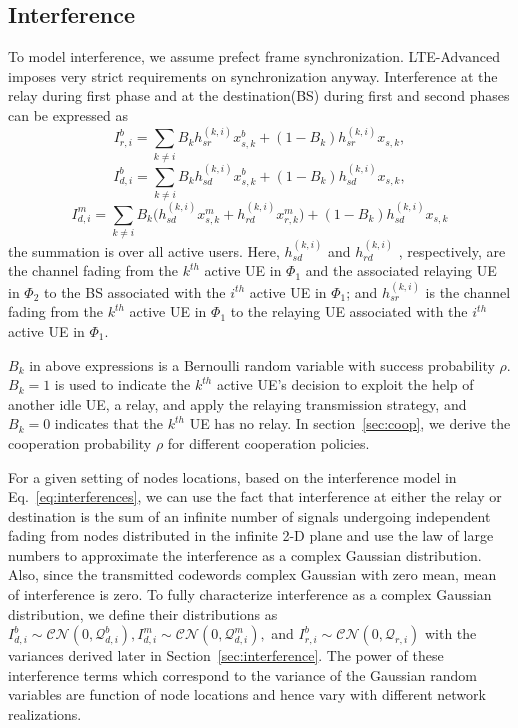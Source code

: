 \documentclass[titlepage]{article}
\begin{document}
\subsection{Interference}
To model interference, we assume prefect frame synchronization. LTE-Advanced imposes very strict requirements on synchronization anyway. Interference at the relay during first phase and at the destination(BS) during first and second phases can be expressed as
\begin{equation*} 
I_{r,i}^b = \sum_{k \neq i} B_k h^{(k,i)}_{sr} x_{s,k}^b + (1-B_k)h_{sr}^{(k,i)}x_{s,k} ,
\end{equation*}
\begin{equation*}
I_{d,i}^b = \sum_{k \neq i} B_k h_{sd}^{(k,i)} x^b_{s,k} + (1-B_k)h_{sd}^{(k,i)}x_{s,k},
\end{equation*}
\begin{equation} \label{eq:interferences}
I_{d,i}^m = \sum_{k \neq i} B_k \Big(h_{sd}^{(k,i)} x^m_{s,k} + h_{rd}^{(k,i)} x^m_{r,k}\Big) + (1-B_k)h_{sd}^{(k,i)}x_{s,k}
\end{equation}
the summation is over all active users. Here, $h_{sd}^{(k,i)}$ and $h_{rd}^{(k,i)}$ , respectively, are the channel fading from the $k^{th}$ active UE in $\Phi_1$ and the associated relaying UE in $\Phi_2$ to the BS associated with the $i^{th}$ active UE in $\Phi_1$; and $h_{sr}^{(k,i)}$ is the channel fading from the $k^{th}$ active UE in $\Phi_1$ to the relaying UE associated with the $i^{th}$ active UE in $\Phi_1$.
\par $B_k$ in above expressions is a Bernoulli random variable with success probability $\rho$. $B_k = 1$ is used to indicate the $k^{th}$ active UE's decision to exploit the help of another idle UE, a relay, and apply the relaying transmission strategy, and $B_k = 0$ indicates that the $k^{th}$ UE has no relay. In section~\ref{sec:coop}, we derive the cooperation probability $\rho$ for different cooperation policies.
\par
 For a given setting of nodes locations, based on the
interference model in Eq.~\ref{eq:interferences}, we can use the fact
that interference at either the relay or destination is the
sum of an infinite number of signals undergoing independent fading from nodes distributed in the infinite 2-D plane and use the law of large numbers to approximate the interference as a complex Gaussian distribution.
Also, since the transmitted codewords complex Gaussian with zero mean, mean of interference is zero. To fully characterize interference as a
complex Gaussian distribution, we define their distributions as $ I_{d,i}^b \sim \mathcal{CN} (0,\mathcal{Q}_{d,i}^b), I_{d,i}
^m \sim \mathcal{CN}(0,\mathcal{Q}_{d,i}^m),$ and $I_{r,i}^b \sim \mathcal{CN}
(0,\mathcal{Q}_{r,i})$ with the variances derived later
in Section~\ref{sec:interference}. The power of these interference terms which
correspond to the variance of the Gaussian random variables
are function of node locations and hence vary with different
network realizations.
\end{document}
